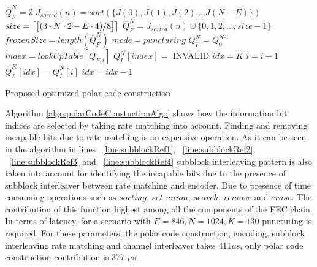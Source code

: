 \IncMargin{1.5em}
\begin{algorithm}[!h]
	$\overline{Q}_{\textit{F}}^{\textit{N}} = \emptyset$ \;
	 {
		 {   %
			$J_{sorted}(n) = sort(\{J(0),J(1),J(2)....J(N-E)\})$\;  \label{line:OptisubblockRef1}
			 {
				$size = \ceil*{\big[(3\cdot N\cdot 2 - E\cdot 4)/8\big]}$\;
			} 
			$\overline{Q}_{F}^{N} = J_{sorted}(n) \cup \{0,1,2, ... ,size-1\}$ \; \label{line:OptisubblockRef2}
			$frozenSize = length(\overline{Q}_{F}^{N})$ \;
			$mode = puncturing$ \;
		} 
	}
	$Q_{\textit{I}}^{\textit{N}} = Q_{\textit{0}}^{\textit{N-1}}$ \;	
	 {
		 {
			$index = lookUpTable[\overline{Q}_{F,i}]$\;
		} 
		$Q_{I}^{N}[index] = $ INVALID \;
	}
	$idx = K$ \;
	 {
		$i = i-1$ \;
		 {
			$\overline{Q}_{\textit{I}}^{\textit{K}}[idx] = Q_{I}^{N}[i]$ \;
			$idx = idx-1$ \;
		}
	}
	\caption{Proposed optimized polar code construction}
	\label{algo:polarCodeConstuctionAlgoOptimized}
\end{algorithm}
\DecMargin{1.5em}

Algorithm \ref{algo:polarCodeConstuctionAlgo} shows how the information bit indices are selected by taking rate matching into account. Finding and removing incapable bits due to rate matching is an expensive operation. As it can be seen in the algorithm in lines ~\ref{line:subblockRef1}, ~\ref{line:subblockRef2}, ~\ref{line:subblockRef3} and ~\ref{line:subblockRef4} subblock interleaving pattern is also taken into account for identifying the incapable bits due to the presence of subblock interleaver between rate matching and encoder. Due to presence of time consuming operations such as $ sorting $, $ set\_union $, $ search $, $ remove $ and $ erase $. The contribution of this function highest among all the components of the FEC chain. In terms of latency, for a scenario with $E = 846, N = 1024, K = 130$ puncturing is required. For these parameters, the polar code construction, encoding, subblock interleaving rate matching and channel interleaver takes 411$\mu$s, only polar code construction contribution is 377 $\mu$s. \newline


